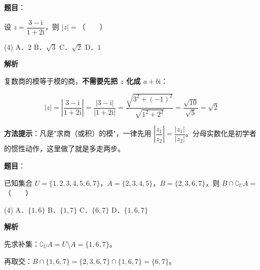 \begin{answer}

\textbf{题目}：

设 $z=\dfrac{3-\mathrm i}{1+2\mathrm i}$，则 $|z|=$\mbox{（　　）}

\begin{gkopts}(4)
\task A．$2$
\task B．$\sqrt3$
\task C．$\sqrt2$
\task D．$1$
\end{gkopts}

\textbf{解析}

复数商的模等于模的商，\textbf{不需要先把 $z$ 化成 $a+b\mathrm i$}：

\nopagebreak[4]
\[|z|=\left|\frac{3-\mathrm i}{1+2\mathrm i}\right|=\frac{|3-\mathrm i|}{|1+2\mathrm i|}=\frac{\sqrt{3^{2}+(-1)^{2}}}{\sqrt{1^{2}+2^{2}}}=\frac{\sqrt{10}}{\sqrt5}=\sqrt2\]

\begin{gktip}
\textbf{方法提示}：凡是"求商（或积）的模"，一律先用 $\left|\dfrac{z_1}{z_2}\right|=\dfrac{|z_1|}{|z_2|}$。分母实数化是初学者的惯性动作，这里做了就是多走两步。
\end{gktip}


\par\medskip

\end{answer}
\begin{answer}

\textbf{题目}：

已知集合 $U=\{1,2,3,4,5,6,7\}$，$A=\{2,3,4,5\}$，$B=\{2,3,6,7\}$，则 $B\cap\complement_U A=$\mbox{（　　）}

\begin{gkopts}(4)
\task A．$\{1,6\}$
\task B．$\{1,7\}$
\task C．$\{6,7\}$
\task D．$\{1,6,7\}$
\end{gkopts}

\textbf{解析}

先求补集：$\complement_U A=U\setminus A=\{1,6,7\}$。

再取交：$B\cap\{1,6,7\}=\{2,3,6,7\}\cap\{1,6,7\}=\{6,7\}$。


\par\medskip

\end{answer}
